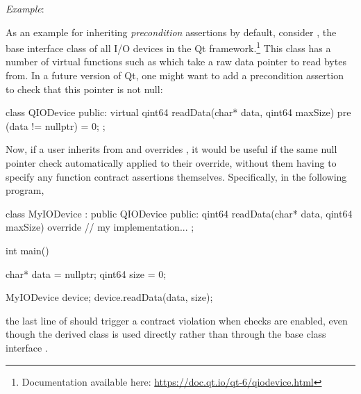\emph{Example}:

As an example for inheriting \emph{precondition} assertions by default, consider , the base interface class of all I/O devices in the Qt framework.\footnote{Documentation available here: \url{https://doc.qt.io/qt-6/qiodevice.html}} This class has a number of virtual functions such as  which take a raw data pointer to read bytes from. In a future version of Qt, one might want to add a precondition assertion to check that this pointer is not null:
\begin{codeblock}
class QIODevice {
public:
  virtual qint64 readData(char* data, qint64 maxSize)
    pre (data != nullptr) = 0;
};
\end{codeblock}
Now, if a user inherits from  and overrides , it would be useful if the same null pointer check automatically applied to their override, without them having to specify any function contract assertions themselves. Specifically, in the following program,
\begin{codeblock}
class MyIODevice : public QIODevice {
public:
  qint64 readData(char* data, qint64 maxSize) override {
    // my implementation...
  }
};

int main() {
  char* data = nullptr;
  qint64 size = 0;
  
  MyIODevice device;
  device.readData(data, size);
}
\end{codeblock}
the last line of  should trigger a contract violation when checks are enabled, even though the derived class  is used directly rather than through the base class interface . 

